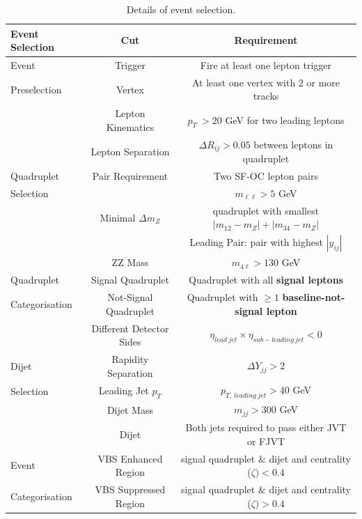 \begin{table}[!htb]
	\centering
		\caption{Details of event selection.\label{tab:EventSelection}}
		\begin{tabular}{|| l || c | c ||}
		\hline
		Event Selection 		& Cut 					& Requirement														\\
		\hline\hline
		Event  				& Trigger 					&  Fire at least one lepton trigger										\\
		Preselection         		& Vertex				 	& At least one vertex with $2$ or more tracks								\\
		\hline  
		 			& Lepton Kinematics 		& $p_{T}~ > 20$ GeV for two leading leptons						\\
					& Lepton Separation 		& $\Delta R_{ij} > 0.05$ between leptons in quadruplet		\\
		Quadruplet	& Pair Requirement 			& Two SF-OC lepton pairs											\\
		Selection	&						& $m_{\ell\ell} > 5$ GeV									\\
					& Minimal $\Delta m_{Z}$ 	& quadruplet with smallest $|m_{12}	- m_{Z} | + |m_{34}	- m_{Z} |$\\
					&						& Leading Pair: pair with highest $|y_{ij}|$						\\
					& ZZ Mass				& $m_{4\ell} > 130 $ GeV											\\
		\hline  
		Quadruplet 			& Signal Quadruplet			& Quadruplet with all \textbf{signal leptons}							\\
		Categorisation			& Not-Signal Quadruplet 		& Quadruplet with $\geq 1$ \textbf{baseline-not-signal lepton}			\\
		\hline  
		 			& Different Detector Sides		& $\eta_{lead~jet} \times \eta_{sub-leading~jet} < 0 $			\\
		Dijet		& Rapidity Separation 		& $	\Delta Y_{jj}> 2 $												\\
		Selection	& Leading Jet $p_{T}$ 	& 	$p_{T,~leading~jet} > 40$ GeV				\\
					& Dijet Mass 				& $m_{jj} > 300 $ GeV													\\
					& Dijet 		& Both jets required to pass either JVT or FJVT 							\\
		\hline  
							
		Event				& VBS Enhanced Region 		& signal quadruplet $\&$ dijet and centrality ($\zeta) < 0.4 $				\\
		Categorisation			& VBS Suppressed Region 	& signal quadruplet $\&$ dijet and centrality ($\zeta) > 0.4$				\\
		
		\hline
	\end{tabular}
\end{table}


